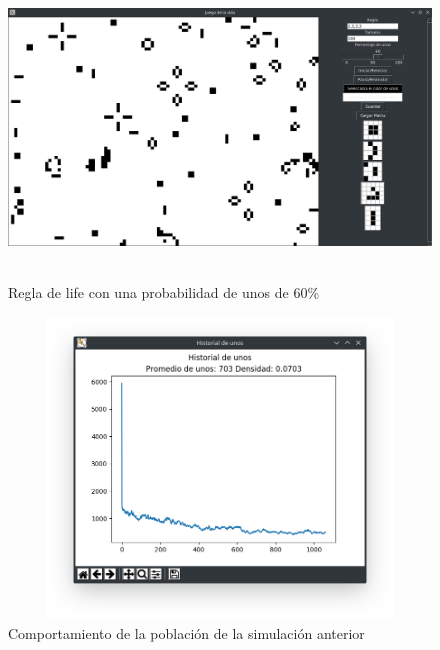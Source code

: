 \begin{figure}[H]
\begin{center}
 \includegraphics[width=12cm, height=8cm]{./img/life60.png}
 \caption{Regla de life con una probabilidad de unos de 60\%}
 \label{fig:life60}
\end{center}
\end{figure}

\begin{figure}[H]
\begin{center}
 \includegraphics[width=12cm, height=8cm]{./img/life60grafica.png}
 \caption{Comportamiento de la población de la simulación anterior}
 \label{fig:life60grafica}
\end{center}
\end{figure}

